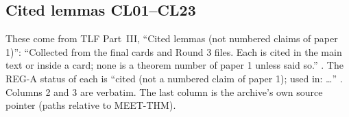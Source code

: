 \subsection{Cited lemmas CL01--CL23}\label{sec:cited}
These come from TLF Part~III, ``Cited lemmas (not numbered claims of paper 1)'': ``Collected from the final cards and Round 3 files. Each is cited in the main text or inside a card; none is a theorem number of paper 1 unless said so.'' . The REG-A status of each is ``cited (not a numbered claim of paper 1); used in: \ldots'' . Columns 2 and 3 are verbatim. The last column is the archive's own source pointer (paths relative to MEET-THM).

